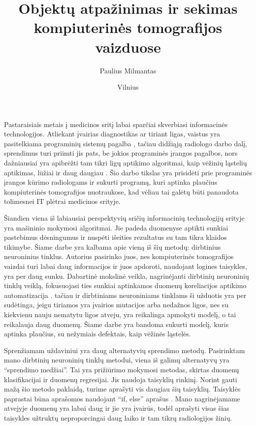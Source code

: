 \documentclass{VUMIFInfKursinis}
\title{Objektų atpažinimas ir sekimas kompiuterinės tomografijos vaizduose}
\author{Paulius Milmantas}
\date{Vilnius \\ \the\year}
\begin{document}
\maketitle

Pastaraisiais metais į medicinos sritį labai sparčiai skverbiasi informacinės technologijos. Atliekant
įvairias diagnostikas ar tiriant ligas, vaistus yra pasitelkiama programinių sistemų pagalba \cite{salt22}, tačiau
didžiąją radiologo darbo dalį, sprendimus turi priimti jis pats, be jokios programinės įrangos pagalbos,
nors dažniausiai yra apibrėžti tam tikri ligų aptikimo algoritmai, kaip vėžinių ląstelių aptikimas,
lūžiai ir daug daugiau \cite{salt23}. Šio darbo tikslas yra prisidėti prie programinės įrangos kūrimo radiologams
ir sukurti programą, kuri aptinka plaučius kompiuterinės tomografijos
nuotraukose, kad vėliau tai galėtų būti panaudota tolimesnei
IT plėtrai medicinos srityje.
\par
Šiandien viena iš labiausiai perspektyvių sričių informacinių technologijų srityje yra mašininio mokymosi algoritmai. 
Jie padeda duomenyse aptikti sunkiai pastebimus dėsningumus ir nuspėti išeities rezultatus su tam tikra klaidos tikimybe.
Šiame darbe yra kalbama apie vieną iš šių metodų: dirbtinius neuroninius tinklus.
Autorius pasirinko juos, nes kompiuterinės tomografijos vaizdai turi labai daug informacijos ir juos apdoroti,
naudojant logines taisykles, yra per daug sunku. 
Dabartinė mokslinė veikla, nagrinėjanti dirbtinių neuroninių tinklų veiklą,
fokusuojasi ties sunkiai aptinkamos duomenų koreliacijos aptikimo
automatizacija \cite{salt24}.
tačiau ir dirbtiniams neuroniniams tinklams ši užduotis yra per sudėtinga, jeigu
tiriamos yra įvairios mutacijos arba nedažnos ligos, nes su kiekvienu nauju nematytu ligos atveju,
yra reikalinga apmokyti modelį, o tai reikalauja daug duomenų. Šiame 
darbe yra bandoma sukurti modelį, kuris aptinka plaučius, su nežymiais defektais, kaip vėžinės ląstelės.
\par
Sprenžiamam uždaviniui yra daug alternatyvių sprendimo metodų.
Pasirinktam mano dirbtinių neuroninių tinklų metodui, viena iš galimų alternatyvų yra \enquote{sprendimo medžiai}.
Tai yra prižiūrimo mokymosi metodas, skirtas duomenų klasifikacijai ir duomenų regresijai. Jis
naudoja taisyklių rinkinį. Norint gauti mažą šio metodo paklaidą, turime aprašyti vis daugiau šių taisyklių.
Taisyklės paprastai būna aprašomos naudojant \enquote{if, else} aprašus \cite{salt1}. Mano nagrinėjamame atvejyje duomenų yra labai daug ir jie yra įvairūs, todėl aprašyti visas šias taisykles užtruktų neproporcingai daug laiko ir tam
tikrų radiologijos žinių.
\end{document}

